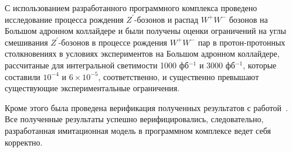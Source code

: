 С использованием разработанного программного комплекса проведено исследование процесса рождения ${Z}^{\prime}$-бозонов и распад ${W}^{+}{W}^{-}$ бозонов на Большом адронном коллайдере и были получены оценки ограничений на углы смешивания ${Z}^{\prime}$-бозонов в
процессе рождения ${W}^{+}$${W}^{-}$ пар в протон-протонных столкновениях
в условиях экспериментов на Большом адронном коллайдере, рассчитаные для интегральной светимости 1000 фб${}^{-1}$ и 3000 фб${}^{-1}$, которые составили  ${10}^{-4}$ и $6\times{10}^{-5}$, соответственно, и существенно превышают существующие экспериментальные ограничения.

Кроме этого была проведена верификация полученных результатов с
работой~\cite{2part-pankov}. Все полученные результаты успешно верифицировались,
следовательно, разработанная имитационная модель в программном комплексе
ведет себя корректно.